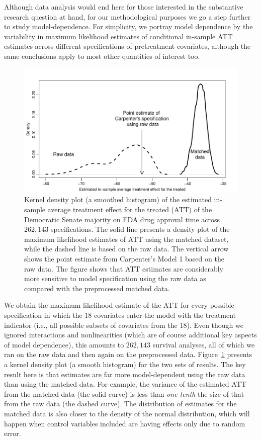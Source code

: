 \documentclass[11pt,titlepage]{article}
\begin{document}
Although data analysis would end here for those interested in the
substantive research question at hand, for our methodological purposes
we go a step further to study model-dependence.  For simplicity, we
portray model dependence by the variability in maximum likelihood
estimates of conditional in-sample ATT estimates across different
specifications of pretreatment covariates, although the same
conclusions apply to most other quantities of interest too.
\begin{figure}[t] 
 \begin{center}
   \includegraphics{figs/fdadens.pdf}
  \end{center}
  \vspace{-0.15in}
  \caption{Kernel density plot (a smoothed histogram) of the estimated
    in-sample average treatment effect for the treated (ATT) of the
    Democratic Senate majority on FDA drug approval time across
    $262,143$ specifications. The solid line presents a density plot
    of the maximum likelihood estimates of ATT using the matched
    dataset, while the dashed line is based on the raw data.  The
    vertical arrow shows the point estimate from Carpenter's Model 1
    based on the raw data.  The figure shows that ATT estimates are
    considerably more sensitive to model specification using the raw
    data as compared with the preprocessed matched data.}
  \label{fg:fdadens}
\end{figure}

We obtain the maximum likelihood estimate of the ATT for every
possible specification in which the 18 covariates enter the model with
the treatment indicator (i.e., all possible subsets of covariates from
the 18).  Even though we ignored interactions and nonlinearities
(which are of course additional key aspects of model dependence), this
amounts to $262,143$ survival analyses, all of which we ran on the raw
data and then again on the preprocessed data.  Figure~\ref{fg:fdadens}
presents a kernel density plot (a smooth histogram) for the two sets
of results.  The key result here is that estimates are far more
model-dependent using the raw data than using the matched data.  For
example, the variance of the estimated ATT from the matched data (the
solid curve) is less than \emph{one tenth} the size of that from the
raw data (the dashed curve).  The distribution of estimates for the
matched data is also closer to the density of the normal distribution,
which will happen when control variables included are having effects
only due to random error.
\end{document}
